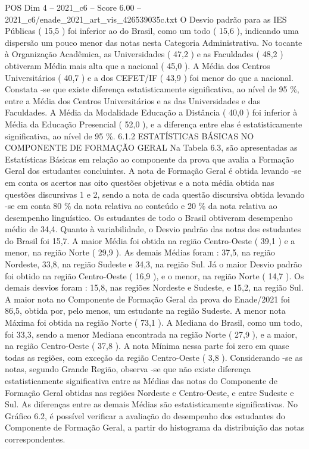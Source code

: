 \begin{textsample}{POS Dim 4 – 2021\_c6 – Score 6.00 – 2021\_c6/enade\_2021\_art\_vis\_426539035c.txt}
O Desvio padrão para as IES Públicas ( 15,5 ) foi inferior ao do Brasil, como um todo ( 15,6 ), indicando uma dispersão um pouco menor das notas nesta Categoria Administrativa.
No tocante à Organização Acadêmica, as Universidades ( 47,2 ) e as Faculdades ( 48,2 ) obtiveram Média mais alta que a nacional ( 45,0 ).
A Média dos Centros Universitários ( 40,7 ) e a dos CEFET/IF ( 43,9 ) foi menor do que a nacional.
Constata -se que existe diferença estatisticamente significativa, ao nível de 95 \%, entre a Média dos Centros Universitários e as das Universidades e das Faculdades.
A Média da Modalidade Educação a Distância ( 40,0 ) foi inferior à Média da Educação Presencial ( 52,0 ), e a diferença entre elas é estatisticamente significativa, ao nível de 95 \%. 6.1.2 ESTATÍSTICAS BÁSICAS NO COMPONENTE DE FORMAÇÃO GERAL Na Tabela 6.3, são apresentadas as Estatísticas Básicas em relação ao componente da prova que avalia a Formação Geral dos estudantes concluintes.
A nota de Formação Geral é obtida levando -se em conta os acertos nas oito questões objetivas e a nota média obtida nas questões discursivas 1 e 2, sendo a nota de cada questão discursiva obtida levando -se em conta 80 \% da nota relativa ao conteúdo e 20 \% da nota relativa ao desempenho linguístico.
Os estudantes de todo o Brasil obtiveram desempenho médio de 34,4.
Quanto à variabilidade, o Desvio padrão das notas dos estudantes do Brasil foi 15,7.
A maior Média foi obtida na região Centro-Oeste ( 39,1 ) e a menor, na região Norte ( 29,9 ).
As demais Médias foram : 37,5, na região Nordeste, 33,8, na região Sudeste e 34,3, na região Sul.
Já o maior Desvio padrão foi obtido na região Centro-Oeste ( 16,9 ), e o menor, na região Norte ( 14,7 ).
Os demais desvios foram : 15,8, nas regiões Nordeste e Sudeste, e 15,2, na região Sul.
A maior nota no Componente de Formação Geral da prova do Enade/2021 foi 86,5, obtida por, pelo menos, um estudante na região Sudeste.
A menor nota Máxima foi obtida na região Norte ( 73,1 ).
A Mediana do Brasil, como um todo, foi 33,3, sendo a menor Mediana encontrada na região Norte ( 27,9 ), e a maior, na região Centro-Oeste ( 37,8 ).
A nota Mínima nessa parte foi zero em quase todas as regiões, com exceção da região Centro-Oeste ( 3,8 ).
Considerando -se as notas, segundo Grande Região, observa -se que não existe diferença estatisticamente significativa entre as Médias das notas do Componente de Formação Geral obtidas nas regiões Nordeste e Centro-Oeste, e entre Sudeste e Sul.
As diferenças entre as demais Médias são estatisticamente significativas.
No Gráfico 6.2, é possível verificar a avaliação do desempenho dos estudantes do Componente de Formação Geral, a partir do histograma da distribuição das notas correspondentes.

\end{textsample}

